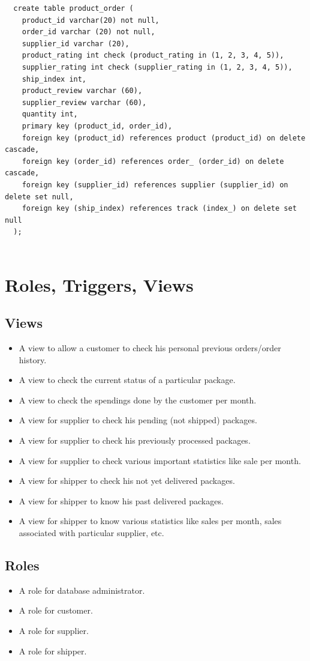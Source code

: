 \documentclass[a4paper,12pt]{article} %
\begin{document}
\begin{verbatim}
  create table product_order (
    product_id varchar(20) not null,
    order_id varchar (20) not null,
    supplier_id varchar (20),
    product_rating int check (product_rating in (1, 2, 3, 4, 5)),
    supplier_rating int check (supplier_rating in (1, 2, 3, 4, 5)),
    ship_index int,
    product_review varchar (60),
    supplier_review varchar (60),
    quantity int,
    primary key (product_id, order_id),
    foreign key (product_id) references product (product_id) on delete cascade,
    foreign key (order_id) references order_ (order_id) on delete cascade,
    foreign key (supplier_id) references supplier (supplier_id) on delete set null,
    foreign key (ship_index) references track (index_) on delete set null
  );
  
\end{verbatim}
\section{Roles, Triggers, Views}
\subsection{Views}

\begin{itemize}
    \item A view to allow a customer to check his personal previous orders/order history.
    \item A view to check the current status of a particular package.
    \item A view to check the spendings done by the customer per month.
    \item A view for supplier to check his pending (not shipped) packages.
    \item A view for supplier to check his previously processed packages.
    \item A view for supplier to check various important statistics like sale per month. 
    \item A view for shipper to check his not yet delivered packages.
    \item A view for shipper to know his past delivered packages.
    \item A view for shipper to know various statistics like sales per month, sales associated with particular supplier, etc.
\end{itemize}


\subsection{Roles}
\begin{itemize}
    \item A role for database administrator.
    \item A role for customer.
    \item A role for supplier.
    \item A role for shipper.
\end{itemize}
\end{document}

